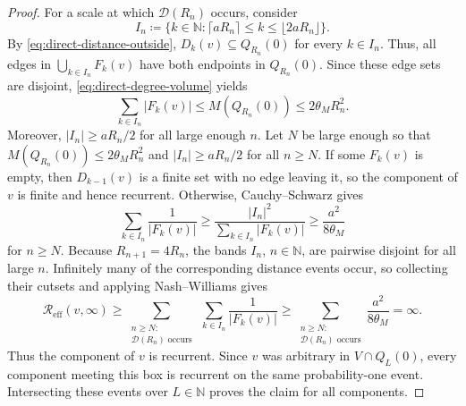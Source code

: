 \documentclass[10pt,a4paper]{amsart}
\newcommand{\N}{\mathbb{N}}
\newcommand{\Reff}{\mathcal{R}_{\mathrm{eff}}}
\begin{document}
\begin{proof}
For a scale at which \(\mathcal D(R_n)\) occurs, consider
\[
  I_n\coloneqq 
  \big\{k\in\N:
    \lceil aR_n\rceil\le k\le\lfloor2aR_n\rfloor
  \big\}.
\]
By \eqref{eq:direct-distance-outside},
\(D_k(v)\subseteq Q_{R_n}(0)\) for every \(k\in I_n\).  Thus, all edges in
\(\bigcup_{k\in I_n}F_k(v)\) have both endpoints in \(Q_{R_n}(0)\).  Since
these edge sets are disjoint, \eqref{eq:direct-degree-volume} yields
\[
  \sum_{k\in I_n}|F_k(v)|
  \le M(Q_{R_n}(0))
  \le 2 \theta_M R_n^2.
\]
Moreover, \(|I_n|\ge aR_n/2\) for all large enough \(n\). Let $N$ be large enough so that $ M(Q_{R_n}(0))\le 2 \theta_M R_n^2$ and \(|I_n|\ge aR_n/2\) for all $n\geq N$.  If some \(F_k(v)\) is
empty, then \(D_{k-1}(v)\) is a finite set with no edge leaving it, so the
component of \(v\) is finite and hence recurrent.  Otherwise,
Cauchy--Schwarz gives
\begin{equation}
\label{eq:direct-resistance-band}
  \sum_{k\in I_n}\frac1{|F_k(v)|}
  \ge
  \frac{|I_n|^2}{\sum_{k\in I_n}|F_k(v)|}
  \ge
  \frac{a^2}{8 \theta_M}
\end{equation}
for $n\geq N$.
Because \(R_{n+1}=4R_n\), the bands \(I_n\), \(n \in \N\), are pairwise disjoint for all
large \(n\).  Infinitely many of the corresponding distance events occur, so
collecting their cutsets and applying Nash--Williams gives
\[
  \Reff(v,\infty)
  \ge
  \sum_{\substack{n \geq N: \\ \mathcal D(R_n)\text{ occurs}}}
  \ \sum_{k\in I_n}\frac1{|F_k(v)|}
  \ge
  \sum_{\substack{n \geq N: \\ \mathcal D(R_n)\text{ occurs}}}
  \frac{a^2}{8 \theta_M}
  =
  \infty.
\]
Thus the component of \(v\) is recurrent. Since $v$ was arbitrary in
\(V\cap Q_L(0)\), every component meeting this box is recurrent on the same
probability-one event. Intersecting these events over \(L\in\N\) proves the
claim for all components.
\end{proof}
\end{document}
